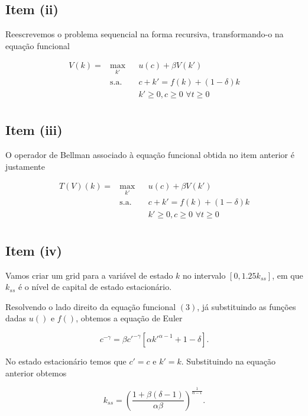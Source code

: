 \documentclass{article}
\begin{document}
\subsection*{Item (ii)}

Reescrevemos o problema sequencial na forma recursiva, transformando-o na equação funcional

\begin{equation}
\begin{aligned}
V(k) = & \max_{k'} & & u(c) + \beta V(k') \\
& \text{s.a.} & &  c + k' = f(k) + (1-\delta) k \\
& & &  k' \geq 0, c \geq 0 \,\, \forall t \geq 0  \\
\end{aligned}
\end{equation}

\subsection*{Item (iii)}

O operador de Bellman associado à equação funcional obtida no item anterior é justamente

\begin{equation}
\begin{aligned}
T(V)(k) = & \max_{k'} & & u(c) + \beta V(k') \\
& \text{s.a.} & &  c + k' = f(k) + (1-\delta) k \\
& & &  k' \geq 0, c \geq 0 \,\, \forall t \geq 0  \\
\end{aligned}
\end{equation}

\subsection*{Item (iv)}

Vamos criar um grid para a variável de estado $k$ no intervalo $[0, 1.25 k_{ss}]$, em que $k_{ss}$ é o nível
de capital de estado estacionário. 

Resolvendo o lado direito da equação funcional $(3)$, já substituindo as funções dadas $u()$ e $f()$, 
obtemos a equação de Euler

$$ c^{-\gamma} = \beta c'^{-\gamma} [\alpha k'^{\alpha-1} + 1 - \delta].$$

No estado estacionário temos que $c' = c$ e $k' = k$. Substituindo na equação anterior obtemos

$$k_{ss} = \left( \frac{1 + \beta (\delta - 1)}{\alpha \beta} \right)^{\frac{1}{\alpha - 1}}.$$

\begin{lstlisting}
\end{lstlisting}
\end{document}
